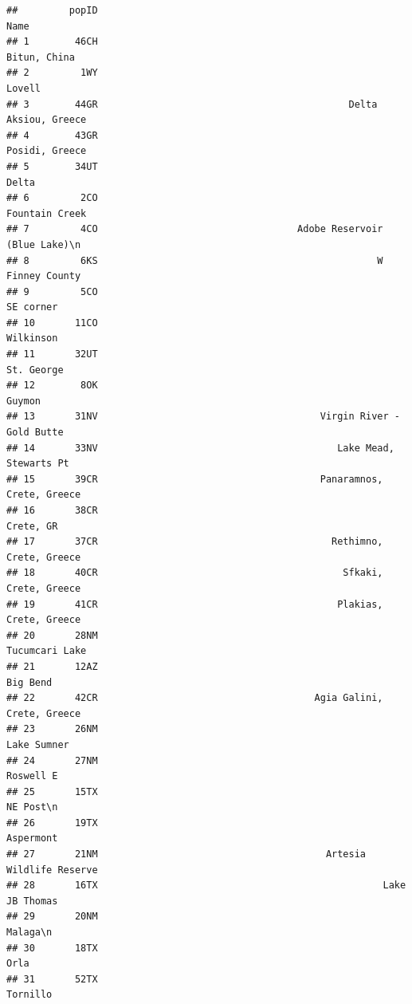 \documentclass[]{article}
\begin{document}
\begin{verbatim}
##         popID                                                            Name
## 1        46CH                                                    Bitun, China
## 2         1WY                                                          Lovell
## 3        44GR                                            Delta Aksiou, Greece
## 4        43GR                                                  Posidi, Greece
## 5        34UT                                                           Delta
## 6         2CO                                                  Fountain Creek
## 7         4CO                                   Adobe Reservoir (Blue Lake)\n
## 8         6KS                                                 W Finney County
## 9         5CO                                                       SE corner
## 10       11CO                                                       Wilkinson
## 11       32UT                                                      St. George
## 12        8OK                                                          Guymon
## 13       31NV                                       Virgin River - Gold Butte
## 14       33NV                                          Lake Mead, Stewarts Pt
## 15       39CR                                       Panaramnos, Crete, Greece
## 16       38CR                                                       Crete, GR
## 17       37CR                                         Rethimno, Crete, Greece
## 18       40CR                                           Sfkaki, Crete, Greece
## 19       41CR                                          Plakias, Crete, Greece
## 20       28NM                                                  Tucumcari Lake
## 21       12AZ                                                        Big Bend
## 22       42CR                                      Agia Galini, Crete, Greece
## 23       26NM                                                     Lake Sumner
## 24       27NM                                                       Roswell E
## 25       15TX                                                       NE Post\n
## 26       19TX                                                       Aspermont
## 27       21NM                                        Artesia Wildlife Reserve
## 28       16TX                                                  Lake JB Thomas
## 29       20NM                                                        Malaga\n
## 30       18TX                                                            Orla
## 31       52TX                                                        Tornillo

\end{verbatim}
\end{document}

